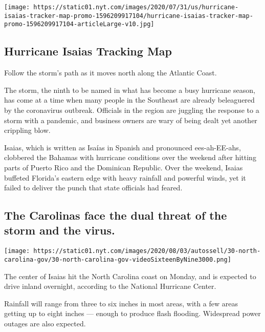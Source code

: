 \href{https://www.nytimes.com/interactive/2020/07/31/us/hurricane-isaias-tracker-map.html}{}

\texttt{[image: https://static01.nyt.com/images/2020/07/31/us/hurricane-isaias-tracker-map-promo-1596209917104/hurricane-isaias-tracker-map-promo-1596209917104-articleLarge-v10.jpg]}

\hypertarget{hurricane-isaias-tracking-map}{%
\subsection{Hurricane Isaias Tracking
Map}\label{hurricane-isaias-tracking-map}}

Follow the storm's path as it moves north along the Atlantic Coast.

The storm, the ninth to be named in what has become a busy hurricane
season, has come at a time when many people in the Southeast are already
beleaguered by the coronavirus outbreak. Officials in the region are
juggling the response to a storm with a pandemic, and business owners
are wary of being dealt yet another crippling blow.

Isaias, which is written as Isaías in Spanish and pronounced
ees-ah-EE-ahs, clobbered the Bahamas with hurricane conditions over the
weekend after hitting parts of Puerto Rico and the Dominican Republic.
Over the weekend, Isaias buffeted Florida's eastern edge with heavy
rainfall and powerful winds, yet it failed to deliver the punch that
state officials had feared.

\hypertarget{the-carolinas-face-the-dual-threat-of-the-storm-and-the-virus}{%
\subsection{The Carolinas face the dual threat of the storm and the
virus.}\label{the-carolinas-face-the-dual-threat-of-the-storm-and-the-virus}}

\texttt{[image: https://static01.nyt.com/images/2020/08/03/autossell/30-north-carolina-gov/30-north-carolina-gov-videoSixteenByNine3000.png]}

The center of Isaias hit the North Carolina coast on Monday, and is
expected to drive inland overnight, according to the National Hurricane
Center.

Rainfall will range from three to six inches in most areas, with a few
areas getting up to eight inches --- enough to produce flash flooding.
Widespread power outages are also expected.

